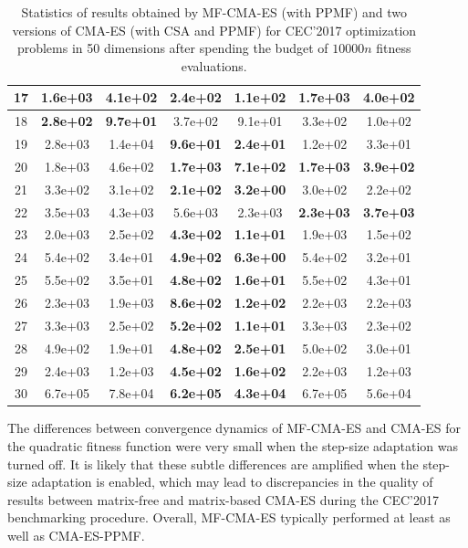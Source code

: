 \documentclass[dvipsnames,format=sigconf,anonymous=false,review=false]{acmart}
\begin{document}
\begin{table}[t!]
{\begin{tabular}{c|c|c|c|c|c|c}
\hline
17 & 1.6e+03 & 4.1e+02 & \textbf{2.4e+02} & \textbf{1.1e+02} & 1.7e+03 & 4.0e+02\\
\hline
18 & \textbf{2.8e+02} & \textbf{9.7e+01} & 3.7e+02 & 9.1e+01 & 3.3e+02 & 1.0e+02\\
\hline
19 & 2.8e+03 & 1.4e+04 & \textbf{9.6e+01} & \textbf{2.4e+01} & 1.2e+02 & 3.3e+01\\
\hline
20 & 1.8e+03 & 4.6e+02 & \textbf{1.7e+03} & \textbf{7.1e+02} & \textbf{1.7e+03} & \textbf{3.9e+02}\\
\hline
21 & 3.3e+02 & 3.1e+02 & \textbf{2.1e+02} & \textbf{3.2e+00} & 3.0e+02 & 2.2e+02\\
\hline
22 & 3.5e+03 & 4.3e+03 & 5.6e+03 & 2.3e+03 & \textbf{2.3e+03} & \textbf{3.7e+03}\\
\hline
23 & 2.0e+03 & 2.5e+02 & \textbf{4.3e+02} & \textbf{1.1e+01} & 1.9e+03 & 1.5e+02\\
\hline
24 & 5.4e+02 & 3.4e+01 & \textbf{4.9e+02} & \textbf{6.3e+00} & 5.4e+02 & 3.2e+01\\
\hline
25 & 5.5e+02 & 3.5e+01 & \textbf{4.8e+02} & \textbf{1.6e+01} & 5.5e+02 & 4.3e+01\\
\hline
26 & 2.3e+03 & 1.9e+03 & \textbf{8.6e+02} & \textbf{1.2e+02} & 2.2e+03 & 2.2e+03\\
\hline
27 & 3.3e+03 & 2.5e+02 & \textbf{5.2e+02} & \textbf{1.1e+01} & 3.3e+03 & 2.3e+02\\
\hline
28 & 4.9e+02 & 1.9e+01 & \textbf{4.8e+02} & \textbf{2.5e+01} & 5.0e+02 & 3.0e+01\\
\hline
29 & 2.4e+03 & 1.2e+03 & \textbf{4.5e+02} & \textbf{1.6e+02} & 2.2e+03 & 1.2e+03\\
\hline
30 & 6.7e+05 & 7.8e+04 & \textbf{6.2e+05} & \textbf{4.3e+04} & 6.7e+05 & 5.6e+04\\
\bottomrule
\end{tabular}
}
\caption{Statistics of results obtained by MF-CMA-ES (with PPMF) and two versions of CMA-ES (with CSA and PPMF) for CEC'2017 optimization problems in 50 dimensions after spending the budget of $10000n$ fitness evaluations.}
\label{tab:CEC17-D50}
\end{table}


The differences between convergence dynamics of MF-CMA-ES and CMA-ES for the quadratic fitness function were very small when the step-size adaptation was turned off. It is likely that these subtle differences are amplified when the step-size adaptation is enabled, which may lead to discrepancies in the quality of results between matrix-free and matrix-based CMA-ES during the CEC'2017 benchmarking procedure. Overall, MF-CMA-ES typically performed at least as well as CMA-ES-PPMF.
\end{document}
